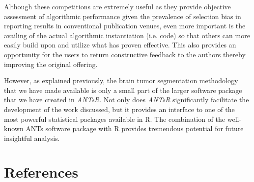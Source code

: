 \documentclass[preprint,authoryear,review,12pt]{elsarticle}
\begin{document}
Although these competitions are extremely useful as they provide objective
assessment of algorithmic performance given the prevalence of selection bias
in reporting results in conventional publication venues, even more important
is the availing of the actual algorithmic instantiation (i.e. code) so that
others can more easily build upon and utilize what has proven effective. 
This also provides an opportunity for the users to return
constructive feedback to the authors thereby improving the original offering.  

However, as explained previously, the brain tumor segmentation 
methodology that we have made available is only a small part of the 
larger software package that we have created in \textit{ANTsR}.  Not only does
\textit{ANTsR} significantly facilitate the development of the work discussed,
but it provides an interface to one of the most powerful statistical
packages available in R.  The combination of the well-known ANTs software
package with R provides tremendous potential for future insightful analysis.




\clearpage
\section*{References}



\end{document}
